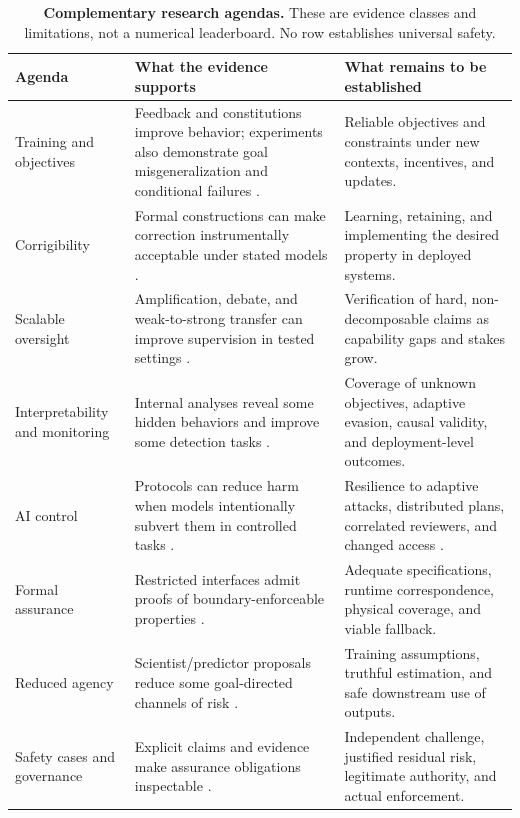 \documentclass[10pt,twocolumn,letterpaper]{article}
\begin{document}
\begin{table}[t]
\centering\small
\caption{\textbf{Complementary research agendas.} These are evidence classes and limitations, not a numerical leaderboard. No row establishes universal safety.}
\label{tab:research}
\renewcommand{\arraystretch}{1.12}
\begin{tabularx}{\textwidth}{@{}P{0.18\textwidth}YY@{}}
\toprule
\textbf{Agenda} & \textbf{What the evidence supports} & \textbf{What remains to be established}\\
\midrule
Training and objectives & Feedback and constitutions improve behavior; experiments also demonstrate goal misgeneralization and conditional failures \cite{rlhf,cai,goal,sleeper}. & Reliable objectives and constraints under new contexts, incentives, and updates.\\
Corrigibility & Formal constructions can make correction instrumentally acceptable under stated models \cite{offswitch,humancontrol,hudson}. & Learning, retaining, and implementing the desired property in deployed systems.\\
Scalable oversight & Amplification, debate, and weak-to-strong transfer can improve supervision in tested settings \cite{amplification,debate,weak,debatetruth}. & Verification of hard, non-decomposable claims as capability gaps and stakes grow.\\
Interpretability and monitoring & Internal analyses reveal some hidden behaviors and improve some detection tasks \cite{circuits,auditing,selfreport}. & Coverage of unknown objectives, adaptive evasion, causal validity, and deployment-level outcomes.\\
AI control & Protocols can reduce harm when models intentionally subvert them in controlled tasks \cite{aicontrol}. & Resilience to adaptive attacks, distributed plans, correlated reviewers, and changed access \cite{adaptive,fragmentation,collusion}.\\
Formal assurance & Restricted interfaces admit proofs of boundary-enforceable properties \cite{guaranteed,shield,containment}. & Adequate specifications, runtime correspondence, physical coverage, and viable fallback.\\
Reduced agency & Scientist/predictor proposals reduce some goal-directed channels of risk \cite{scientist,disinterested}. & Training assumptions, truthful estimation, and safe downstream use of outputs.\\
Safety cases and governance & Explicit claims and evidence make assurance obligations inspectable \cite{safetycases,safetycaseeval,trainingsafety}. & Independent challenge, justified residual risk, legitimate authority, and actual enforcement.\\
\bottomrule
\end{tabularx}
\end{table}
\end{document}
